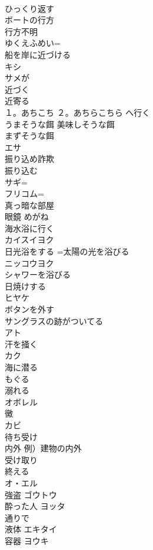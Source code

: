 \documentclass[8pt]{extreport}
\begin{document}
\begin{CJK}{UTF8}{min}
\\	ひっくり返す	
\\	ボートの行方 
\\	行方不明	
\\	ゆくえふめい=
\\	船を岸に近づける	
\\	キシ
\\	サメが 
\\	近づく 
\\	近寄る	
\\	１。あちこち ２。あちらこちら へ行く	
\\	うまそうな餌 美味しそうな餌 
\\	まずそうな餌	
\\	エサ
\\	振り込め詐欺 
\\	振り込む	
\\	サギ=
\\	フリコム=
\\	真っ暗な部屋	
\\	眼鏡	めがね
\\	海水浴に行く	
\\	カイスイヨク
\\	日光浴をする =太陽の光を浴びる	
\\	ニッコウヨク
\\	シャワーを浴びる	
\\	日焼けする	
\\	ヒヤケ
\\	ボタンを外す	
\\	サングラスの跡がついてる	
\\	アト
\\	汗を掻く	
\\	カク
\\	海に潜る	
\\	もぐる
\\	溺れる	
\\	オボレル
\\	黴	
\\	カビ
\\	待ち受け	
\\	内外 例）建物の内外	
\\	受け取り	
\\	終える	
\\	オ・エル
\\	強盗	ゴウトウ 
\\	酔った人	ヨッタ 
\\	通りで	
\\	液体	エキタイ 
\\	容器	ヨウキ 

\end{CJK}
\end{document}
